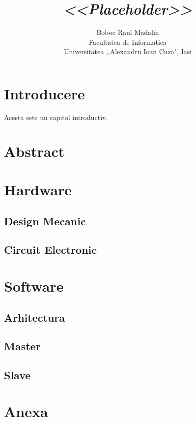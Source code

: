 \documentclass[11pt,a4paper]{report}
\title{\textit{<<Placeholder>>}}
\author{Boboc Raul Madalin\\
        Facultatea de Informatica\\
        Universitatea
        ,\hspace{-0.02cm},Alexandru Ioan Cuza", Iasi}
\begin{document}
\maketitle

% 
\tableofcontents
\thispagestyle{empty}

\fancyhf{}
\clearpage
{}

\chapter*{Introducere}
Acesta este un capitol introductiv.
\newpage

\chapter*{Abstract}

\chapter{Hardware}
\section{Design Mecanic}
\section{Circuit Electronic}

\chapter{Software}
\section{Arhitectura}
\section{Master}
\section{Slave}

\appendix
\chapter*{Anexa}


\begin{thebibliography}{99}
    
\end{thebibliography}
\end{document}
